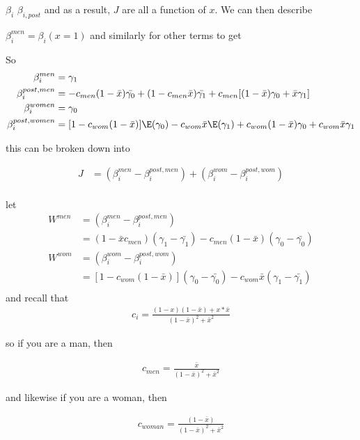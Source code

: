 $\beta_i$ $\beta_{i, post}$ and as a result, $J$ are all a function of $x$. We can then describe

$\beta_{i}^{men} = \beta_i (x=1)$ and similarly for other terms to get

So 
\begin{align*}
	\beta_i^{men} &= \gamma_1 \\
	\beta_i^{post,men} &= -c_{men} ( 1- \bar{x}) \bar{\gamma_0} + (1 - c_{men}\bar{x}) \bar{\gamma_1} + c_{men} [ (1-\bar{x}) \gamma_0 + \bar{x}\gamma_1] \\
	\beta_i^{women} &= \gamma_0 \\
	\beta_i^{post,women} &= [ 1 - c_{wom}(1-\bar{x}) ]\E(\gamma_0) - c_{wom} \bar{x} \E(\gamma_1) + c_{wom} (1- \bar{x}) \gamma_0 + c_{wom} \bar{x} \gamma_1 \\
\end{align*} 

this can be broken down into

\begin{align*}
	J &= (\beta_i^{men} - \beta_i^{post, men} )+ (\beta_i^{wom} - \beta_i^{post, wom}) \\
\end{align*} 

let 
 \begin{align*}
	 W^{men} &=  (\beta_i^{men} - \beta_i^{post, men}) \\
			&= (1 - \bar{x} c_{men}) (\gamma_1 - \bar{\gamma_1}) - c_{men} ( 1 - \bar{x}) (\gamma_0 - \bar{\gamma_0}) \\
	 W^{wom} &=  (\beta_i^{wom} - \beta_i^{post, wom}) \\
			 &= [ 1 - c_{wom}(1 - \bar{x}) ] (\gamma_0 - \bar{\gamma_0}) - c_{wom} \bar{x} (\gamma_1 - \bar{\gamma_1}) \\
\end{align*} 
and recall that
\begin{align*}
	c_{i} = \frac{(1-x)(1-\bar{x}) + x*\bar{x}}{(1-\bar{x})^2 + \bar{x}^2}
\end{align*}

so if you are a man, then 

\begin{align*}
	c_{men} =  \frac{\bar{x}}{(1-\bar{x})^2 + \bar{x}^2}
\end{align*}

and likewise if you are a woman, then

\begin{align*}
	c_{woman} = \frac{(1-\bar{x})}{(1-\bar{x})^2 + \bar{x}^2}
\end{align*}


